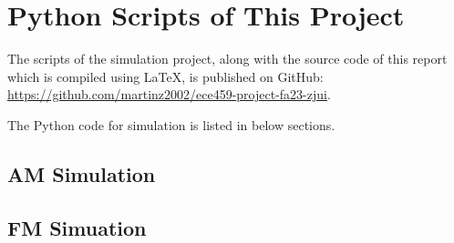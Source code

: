 \documentclass[../../ECE459FinalProjectReport.tex]{subfiles}
\begin{document}
\chapter{Python Scripts of This Project}
The scripts of the simulation project, along with the source code of this report which is compiled using \LaTeX, is published on GitHub: \url{https://github.com/martinz2002/ece459-project-fa23-zjui}.

The Python code for simulation is listed in below sections.

\section{AM Simulation}


\section{FM Simuation}

\end{document}
